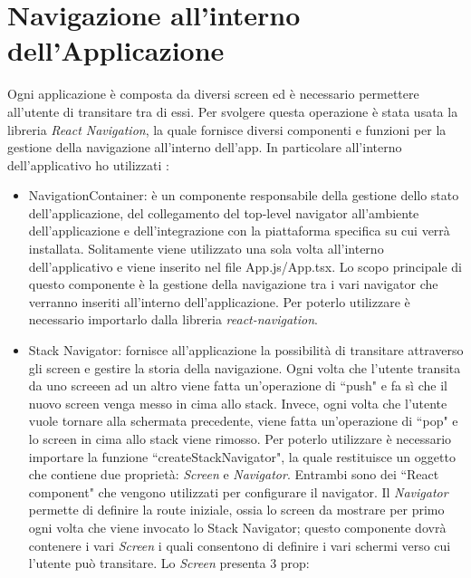\section{Navigazione all'interno dell'Applicazione}
Ogni applicazione \`e composta da diversi screen ed \`e necessario permettere all'utente di transitare tra di essi. Per svolgere questa operazione \`e stata usata la
libreria \textit{React Navigation}, la quale fornisce diversi componenti e funzioni per la gestione della navigazione all'interno dell'app. In particolare all'interno
dell'applicativo ho utilizzati \cite{ReactNavigationContainer} \cite{ReactNavigationStackNavigator}:
\begin{itemize}
    \item NavigationContainer: \`e un componente responsabile della gestione dello stato dell'applicazione, del collegamento del top-level navigator all'ambiente dell'applicazione e dell'integrazione con la piattaforma specifica su cui verr\`a installata.
          Solitamente viene utilizzato una sola volta all'interno dell'applicativo e viene inserito nel file App.js/App.tsx. Lo scopo principale di questo componente \`e la gestione della navigazione tra i vari navigator che verranno inseriti all'interno dell'applicazione. Per poterlo utilizzare \`e necessario importarlo dalla libreria \textit{react-navigation}.
    \item Stack Navigator: fornisce all'applicazione la possibilit\`a di transitare attraverso gli screen e gestire la storia della navigazione. Ogni volta che l'utente transita da uno screeen ad un altro viene fatta un'operazione di ``push" e fa s\`i che il nuovo screen venga messo in cima allo stack. Invece, ogni volta che l'utente vuole tornare
          alla schermata precedente, viene fatta un'operazione di ``pop" e lo screen in cima allo stack viene rimosso. Per poterlo utilizzare \`e necessario importare la funzione ``createStackNavigator", la quale restituisce un oggetto che contiene due propriet\`a: \textit{Screen} e \textit{Navigator}.
          Entrambi sono dei ``React component" che vengono utilizzati per configurare il navigator. Il \textit{Navigator} permette di definire la route iniziale, ossia lo screen da mostrare per primo ogni volta che viene invocato lo Stack Navigator; questo componente dovr\`a contenere i vari \textit{Screen} i quali consentono di definire i vari schermi verso cui l'utente pu\`o transitare.
          Lo \textit{Screen} presenta 3 prop:
\end{itemize}
